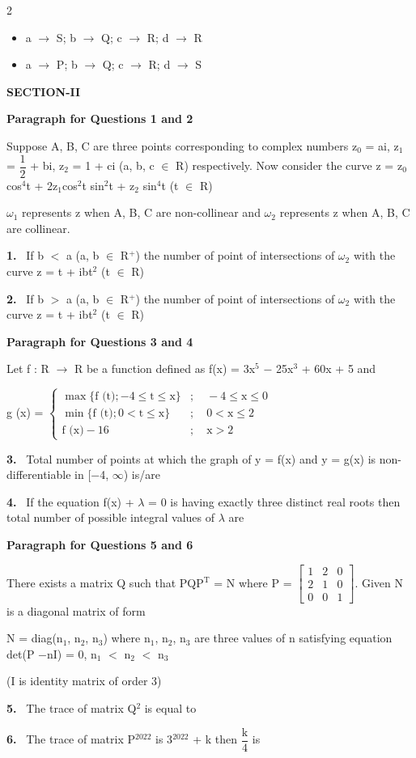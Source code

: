 \documentclass[10pt]{extarticle}
\newcommand{\sect}[1]{\par\smallskip\noindent\textbf{#1}\par}
\newcommand{\qn}[1]{\par\smallskip\noindent\textbf{#1.}~}
\newcommand{\paraq}[2]{\par\smallskip\noindent\textbf{Paragraph for Questions #1 and #2}\par}
\newenvironment{qoptions}{\begin{itemize}[leftmargin=1.8em,itemsep=1pt,topsep=2pt,label={}]}{\end{itemize}}
\newcommand{\opt}[2]{\item[(#1)] #2}
\begin{document}
\begin{multicols}{2}
\begin{qoptions}
\opt{C}{a $\rightarrow$ S; b $\rightarrow$ Q; c $\rightarrow$ R; d $\rightarrow$ R}
\opt{D}{a $\rightarrow$ P; b $\rightarrow$ Q; c $\rightarrow$ R; d $\rightarrow$ S}
\end{qoptions}
\sect{SECTION-II}
\paraq{1}{2}Suppose A, B, C are three points corresponding to complex numbers z$_0$ = ai, z$_1$ = $\dfrac{1}{2}$ + bi, z$_2$ = 1 + ci (a, b, c $\in$ R) respectively. Now consider the curve z = z$_0$cos$^4$t + 2z$_1$cos$^2$t sin$^2$t + z$_2$ sin$^4$t (t $\in$ R)\par
$\omega_1$ represents z when A, B, C are non-collinear and $\omega_2$ represents z when A, B, C are collinear.\par
\qn{1} If b $<$ a (a, b $\in$ R$^+$) the number of point of intersections of $\omega_2$ with the curve z = t + ibt$^2$ (t $\in$ R)\par
\qn{2} If b $>$ a (a, b $\in$ R$^+$) the number of point of intersections of $\omega_2$ with the curve z = t + ibt$^2$ (t $\in$ R)\par
\paraq{3}{4}Let f : R $\rightarrow$ R be a function defined as f(x) = 3x$^5$ $-$ 25x$^3$ + 60x + 5 and\par
g (x) = $\begin{cases}\max\{\text{f (t)};-4\leq\text{t}\leq\text{x}\} & ;\quad -4\leq\text{x}\leq0\\ \min\{\text{f (t)};0<\text{t}\leq\text{x}\} & ;\quad 0<\text{x}\leq2\\ \text{f (x)}-16 & ;\quad \text{x}>2\end{cases}$\par
\qn{3} Total number of points at which the graph of y = f(x) and y = g(x) is non-differentiable in [$-$4, $\infty$) is/are\par
\qn{4} If the equation f(x) + $\lambda$ = 0 is having exactly three distinct real roots then total number of possible integral values of $\lambda$ are\par
\paraq{5}{6}There exists a matrix Q such that PQP$^\text{T}$ = N where P = $\begin{bmatrix}1&2&0\\2&1&0\\0&0&1\end{bmatrix}$. Given N is a diagonal matrix of form\par
N = diag(n$_1$, n$_2$, n$_3$) where n$_1$, n$_2$, n$_3$ are three values of n satisfying equation det(P $-$nI) = 0, n$_1$ $<$ n$_2$ $<$ n$_3$\par
(I is identity matrix of order 3)\par
\qn{5} The trace of matrix Q$^2$ is equal to\par
\qn{6} The trace of matrix P$^{2022}$ is 3$^{2022}$ + k then $\dfrac{\text{k}}{4}$ is\par
\end{multicols}
\end{document}
